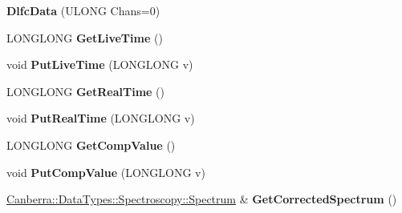 \begin{DoxyCompactItemize}
\item 
\mbox{\label{class_canberra_1_1_data_types_1_1_spectroscopy_1_1_dlfc_data_a0a19700d979484302a3eeaa92769da7d}} 
{\bfseries Dlfc\+Data} (U\+L\+O\+NG Chans=0)
\item 
\mbox{\label{class_canberra_1_1_data_types_1_1_spectroscopy_1_1_dlfc_data_a95dc9009429fc338c3600b5cededfc17}} 
L\+O\+N\+G\+L\+O\+NG {\bfseries Get\+Live\+Time} ()
\item 
\mbox{\label{class_canberra_1_1_data_types_1_1_spectroscopy_1_1_dlfc_data_a1d977e663c3f3320fb5d7fb3077c40e4}} 
void {\bfseries Put\+Live\+Time} (L\+O\+N\+G\+L\+O\+NG v)
\item 
\mbox{\label{class_canberra_1_1_data_types_1_1_spectroscopy_1_1_dlfc_data_ab2779164e8b81db3a1ca008f365fc8a6}} 
L\+O\+N\+G\+L\+O\+NG {\bfseries Get\+Real\+Time} ()
\item 
\mbox{\label{class_canberra_1_1_data_types_1_1_spectroscopy_1_1_dlfc_data_acbfda27271ef77fa832e24feb910bc88}} 
void {\bfseries Put\+Real\+Time} (L\+O\+N\+G\+L\+O\+NG v)
\item 
\mbox{\label{class_canberra_1_1_data_types_1_1_spectroscopy_1_1_dlfc_data_a230498eeaa32b604b7e6d1b1552b08a6}} 
L\+O\+N\+G\+L\+O\+NG {\bfseries Get\+Comp\+Value} ()
\item 
\mbox{\label{class_canberra_1_1_data_types_1_1_spectroscopy_1_1_dlfc_data_a6406e4ea9435df6f1c0b00ecc843215a}} 
void {\bfseries Put\+Comp\+Value} (L\+O\+N\+G\+L\+O\+NG v)
\item 
\mbox{\label{class_canberra_1_1_data_types_1_1_spectroscopy_1_1_dlfc_data_a1b416e6b5a029d3d7b571146714391bf}} 
\hyperlink{class_canberra_1_1_data_types_1_1_spectroscopy_1_1_spectrum}{Canberra\+::\+Data\+Types\+::\+Spectroscopy\+::\+Spectrum} \& {\bfseries Get\+Corrected\+Spectrum} ()

\end{DoxyCompactItemize}
